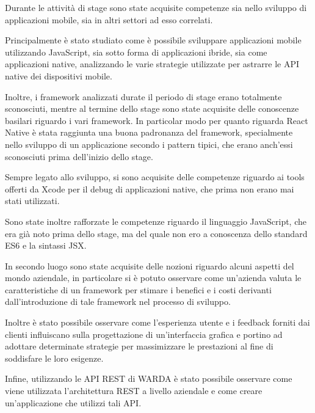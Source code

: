 Durante le attività di stage sono state acquisite competenze sia nello sviluppo di applicazioni mobile, sia in altri settori ad esso correlati.

Principalmente è stato studiato come è possibile sviluppare applicazioni mobile utilizzando JavaScript, sia sotto forma di applicazioni ibride, sia come applicazioni native, analizzando le varie strategie utilizzate per astrarre le API native dei dispositivi mobile.

Inoltre, i framework analizzati durate il periodo di stage erano totalmente sconosciuti, mentre al termine dello stage sono state acquisite delle conoscenze basilari riguardo i vari framework.
In particolar modo per quanto riguarda React Native è stata raggiunta una buona padronanza del framework, specialmente nello sviluppo di un applicazione secondo i pattern tipici, che erano anch'essi sconosciuti prima dell'inizio dello stage.

Sempre legato allo sviluppo, si sono acquisite delle competenze riguardo ai tools offerti da Xcode per il debug di applicazioni native, che prima non erano mai stati utilizzati.

Sono state inoltre rafforzate le competenze riguardo il linguaggio JavaScript, che era già noto prima dello stage, ma del quale non ero a conoscenza dello standard ES6 e la sintassi JSX.

In secondo luogo sono state acquisite delle nozioni riguardo alcuni aspetti del mondo aziendale, in particolare si è potuto osservare come un'azienda valuta le caratteristiche di un framework per stimare i benefici e i costi derivanti dall'introduzione di tale framework nel processo di sviluppo.

Inoltre è stato possibile osservare come l'esperienza utente e i feedback forniti dai clienti influiscano sulla progettazione di un'interfaccia grafica e portino ad adottare determinate strategie per massimizzare le prestazioni al fine di soddisfare le loro esigenze.

Infine, utilizzando le API REST di WARDA è stato possibile osservare come viene utilizzata l'architettura REST a livello aziendale e come creare un'applicazione che utilizzi tali API.
